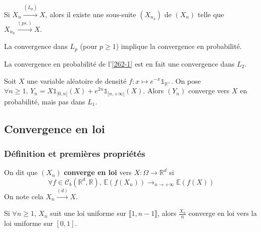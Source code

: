 
	\begin{proposition}
		Si $X_n \overset{(L_p)}{\longrightarrow} X$, alors il existe une sous-suite $(X_{n_k})$ de $(X_n)$ telle que $X_{n_k} \overset{(ps.)}{\longrightarrow} X$.
	\end{proposition}

	\begin{theorem}
		La convergence dans $L_p$ (pour $p \geq 1$) implique la convergence en probabilité.
	\end{theorem}

	\begin{example}
		La convergence en probabilité de l'\cref{262-1} est en fait une convergence dans $L_2$.
	\end{example}


	\begin{cexample}
		Soit $X$ une variable aléatoire de densité $f : x \mapsto e^{-x} \mathbb{1}_{\mathbb{R}^+}$. On pose $\forall n \geq 1, \, Y_n = X \mathbb{1}_{[0,n[}(X) + e^{2n} \mathbb{1}_{[n,+\infty[}(X)$. Alors $(Y_n)$ converge vers $X$ en probabilité, mais pas dans $L_1$.
	\end{cexample}

	\subsection{Convergence en loi}

	\subsubsection{Définition et premières propriétés}


	\begin{definition}
		On dit que $(X_n)$ \textbf{converge en loi} vers $X : \Omega \rightarrow \mathbb{R}^d$ si
		\[ \forall f \in \mathcal{C}_b(\mathbb{R}^d, \mathbb{R}), \, \mathbb{E}(f(X_n)) \longrightarrow_{n \rightarrow +\infty} \mathbb{E}(f(X)) \]
		On note cela $X_n \overset{(d)}{\longrightarrow} X$.
	\end{definition}


	\begin{example}
		Si $\forall n \geq 1$, $X_n$ suit une loi uniforme sur $\llbracket 1, n-1 \rrbracket$, alors $\frac{X_n}{n}$ converge en loi vers la loi uniforme sur $[0,1]$.
	\end{example}

